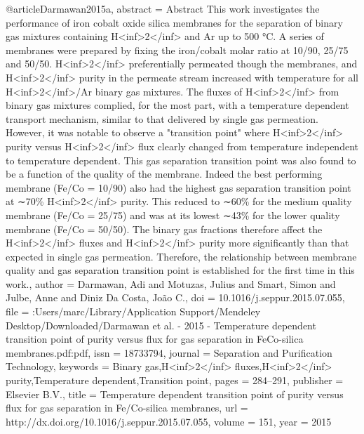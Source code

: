 @article{Darmawan2015a,
abstract = {Abstract This work investigates the performance of iron cobalt oxide silica membranes for the separation of binary gas mixtures containing H{\textless}inf{\textgreater}2{\textless}/inf{\textgreater} and Ar up to 500 °C. A series of membranes were prepared by fixing the iron/cobalt molar ratio at 10/90, 25/75 and 50/50. H{\textless}inf{\textgreater}2{\textless}/inf{\textgreater} preferentially permeated though the membranes, and H{\textless}inf{\textgreater}2{\textless}/inf{\textgreater} purity in the permeate stream increased with temperature for all H{\textless}inf{\textgreater}2{\textless}/inf{\textgreater}/Ar binary gas mixtures. The fluxes of H{\textless}inf{\textgreater}2{\textless}/inf{\textgreater} from binary gas mixtures complied, for the most part, with a temperature dependent transport mechanism, similar to that delivered by single gas permeation. However, it was notable to observe a "transition point" where H{\textless}inf{\textgreater}2{\textless}/inf{\textgreater} purity versus H{\textless}inf{\textgreater}2{\textless}/inf{\textgreater} flux clearly changed from temperature independent to temperature dependent. This gas separation transition point was also found to be a function of the quality of the membrane. Indeed the best performing membrane (Fe/Co = 10/90) also had the highest gas separation transition point at ∼70{\%} H{\textless}inf{\textgreater}2{\textless}/inf{\textgreater} purity. This reduced to ∼60{\%} for the medium quality membrane (Fe/Co = 25/75) and was at its lowest ∼43{\%} for the lower quality membrane (Fe/Co = 50/50). The binary gas fractions therefore affect the H{\textless}inf{\textgreater}2{\textless}/inf{\textgreater} fluxes and H{\textless}inf{\textgreater}2{\textless}/inf{\textgreater} purity more significantly than that expected in single gas permeation. Therefore, the relationship between membrane quality and gas separation transition point is established for the first time in this work.},
author = {Darmawan, Adi and Motuzas, Julius and Smart, Simon and Julbe, Anne and {Diniz Da Costa}, Jo{\~{a}}o C.},
doi = {10.1016/j.seppur.2015.07.055},
file = {:Users/marc/Library/Application Support/Mendeley Desktop/Downloaded/Darmawan et al. - 2015 - Temperature dependent transition point of purity versus flux for gas separation in FeCo-silica membranes.pdf:pdf},
issn = {18733794},
journal = {Separation and Purification Technology},
keywords = {Binary gas,H{\textless}inf{\textgreater}2{\textless}/inf{\textgreater} fluxes,H{\textless}inf{\textgreater}2{\textless}/inf{\textgreater} purity,Temperature dependent,Transition point},
pages = {284--291},
publisher = {Elsevier B.V.},
title = {{Temperature dependent transition point of purity versus flux for gas separation in Fe/Co-silica membranes}},
url = {http://dx.doi.org/10.1016/j.seppur.2015.07.055},
volume = {151},
year = {2015}
}
